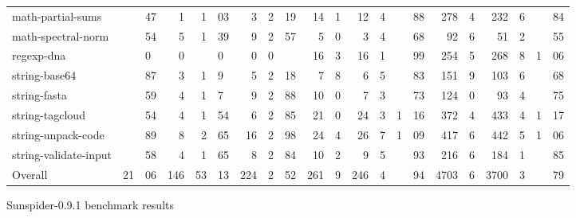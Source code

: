 \begin{figure*}
\begin{center}
\begin{tabular}{|l|r@{.}lr|r@{.}lr|r@{.}l|r@{.}lr@{.}l|r@{.}l|r@{.}lr@{.}l|r@{.}l|}
math-partial-sums        & &47 & 1   & 1&03 & 3  & 2&19
    & 14&1 & 12&4 & &88  & 278&4 & 232&6 & &84 \\
math-spectral-norm       & &54 & 5   & 1&39 & 9  & 2&57
    & 5&0  & 3&4 & &68   & 92&6  & 51&2  & &55 \\
regexp-dna               & &0 & 0   & &0 & 0    & 0&
    & 16&3 & 16&1 & &99  & 254&5 & 268&8 & 1&06 \\
string-base64            & &87 & 3   & 1&9 & 5   & 2&18
    & 7&8  & 6&5 & &83   & 151&9 & 103&6 & &68 \\
string-fasta             & &59 & 4   & 1&7 & 9   & 2&88
    & 10&0 & 7&3 & &73   & 124&0 & 93&4  & &75 \\
string-tagcloud          & &54 & 4   & 1&54 & 6  & 2&85
    & 21&0 & 24&3 & 1&16 & 372&4 & 433&4 & 1&17 \\
string-unpack-code       & &89 & 8   & 2&65 & 16 & 2&98
    & 24&4 & 26&7 & 1&09 & 417&6 & 442&5 & 1&06 \\
string-validate-input    & &58 & 4   & 1&65 & 8  & 2&84
    & 10&2 & 9&5 & &93   & 216&6 & 184&1 & &85 \\

\hline

Overall                  & 21&06 & 146 & 53&13 & 224 & 2&52
    & 261&9 & 246&4 & &94 & 4703&6 & 3700&3 & &79 \\

\hline

\end{tabular}
\end{center}
\caption{Sunspider-0.9.1 benchmark results}
\end{figure*}

